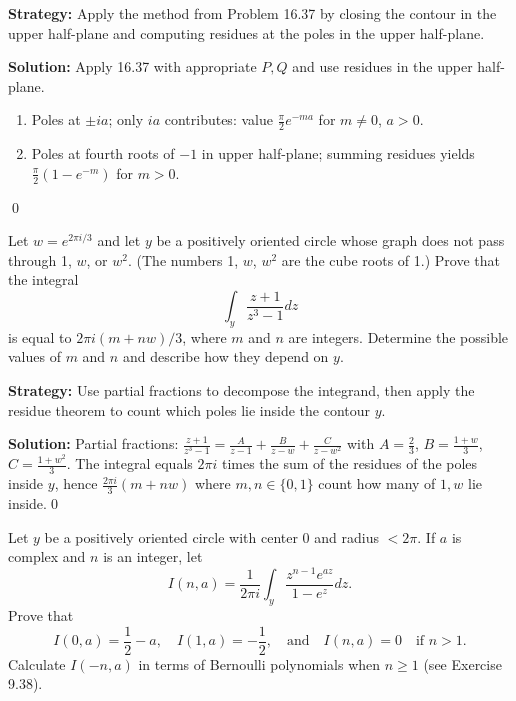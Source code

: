 \noindent\textbf{Strategy:} Apply the method from Problem 16.37 by closing the contour in the upper half-plane and computing residues at the poles in the upper half-plane.

\bigskip\noindent\textbf{Solution:}
Apply 16.37 with appropriate $P,Q$ and use residues in the upper half-plane.
\begin{enumerate}[label=(\alph*)]
\item Poles at $\pm ia$; only $ia$ contributes: value $\frac{\pi}{2}e^{-ma}$ for $m\ne0$, $a>0$.
\item Poles at fourth roots of $-1$ in upper half-plane; summing residues yields $\frac{\pi}{2}(1-e^{-m})$ for $m>0$.
\end{enumerate}\qed


\begin{problembox}
\begin{problemstatement}
Let \( w = e^{2\pi i / 3} \) and let \( y \) be a positively oriented circle whose graph does not pass through 1, \( w \), or \( w^2 \). (The numbers 1, \( w \), \( w^2 \) are the cube roots of 1.) Prove that the integral
\[ \int_y \frac{z + 1}{z^3 - 1} dz \]
is equal to \( 2\pi i (m + n w) / 3 \), where \( m \) and \( n \) are integers. Determine the possible values of \( m \) and \( n \) and describe how they depend on \( y \).
\end{problemstatement}
\end{problembox}

\noindent\textbf{Strategy:} Use partial fractions to decompose the integrand, then apply the residue theorem to count which poles lie inside the contour \( y \).

\bigskip\noindent\textbf{Solution:}
Partial fractions: $\frac{z+1}{z^3-1}=\frac{A}{z-1}+\frac{B}{z-w}+\frac{C}{z-w^2}$ with $A=\tfrac{2}{3}$, $B=\tfrac{1+w}{3}$, $C=\tfrac{1+w^2}{3}$. The integral equals $2\pi i$ times the sum of the residues of the poles inside $y$, hence $\frac{2\pi i}{3}(m+n w)$ where $m,n\in\{0,1\}$ count how many of $1,w$ lie inside.\qed


\begin{problembox}
\begin{problemstatement}
Let \( y \) be a positively oriented circle with center 0 and radius \( < 2\pi \). If \( a \) is complex and \( n \) is an integer, let
\[ I(n, a) = \frac{1}{2\pi i} \int_y \frac{z^{n-1} e^{az}}{1 - e^z} dz. \]
Prove that
\[ I(0, a) = \frac{1}{2} - a, \quad I(1, a) = -\frac{1}{2}, \quad \text{and} \quad I(n, a) = 0 \quad \text{if } n > 1. \]
Calculate \( I(-n, a) \) in terms of Bernoulli polynomials when \( n \geq 1 \) (see Exercise 9.38).
\end{problemstatement}
\end{problembox}

